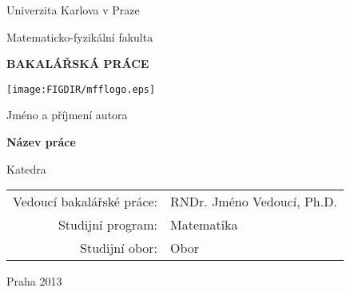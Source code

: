 
\pagestyle{empty}
\begin{center}


{\large Univerzita Karlova v Praze}

\medskip
{\large Matematicko-fyzikální fakulta}

\vfill
{\bfseries\Large BAKALÁŘSKÁ PRÁCE}

\vfill
\centerline{\mbox{\texttt{[image: \\FIGDIR/mfflogo.eps]}}}

\vfill
\vspace{5mm}

{\LARGE Jméno a příjmení autora}

\vspace{15mm}

{\LARGE\bfseries Název práce}

\vfill

Katedra


\vfill

\begin{tabular}{rl}
Vedoucí bakalářské práce: & RNDr. Jméno Vedoucí, Ph.D. \\   %
\noalign{\vspace{2mm}}
Studijní program: & Matematika\\
\noalign{\vspace{2mm}}
Studijní obor: & Obor\\
\end{tabular}

\vfill

Praha 2013

\end{center}




